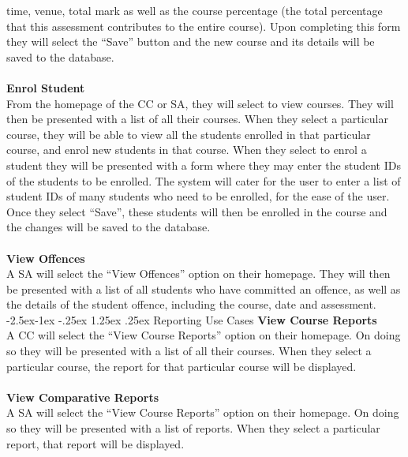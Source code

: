 \documentclass[paper=a4, fontsize=11pt]{scrartcl}
\makeatletter
\numberwithin{equation}{section}		%
\numberwithin{figure}{section}			%
\numberwithin{table}{section}				%
\renewcommand\paragraph{\@startsection{paragraph}{4}{\z@}%
            {-2.5ex\@plus -1ex \@minus -.25ex}%
            {1.25ex \@plus .25ex}%
            {\normalfont\normalsize\bfseries}}
\makeatother
\begin{document}
time, venue, total mark as well as the course percentage (the total percentage that this assessment contributes to the entire course). Upon completing this form they will select the “Save” button and the new course and its details will be saved to the database.\\\\ \textbf{Enrol Student}\\From the homepage of the CC or SA, they will select to view courses. They will then be presented with a list of all their courses. When they select a particular course, they will be able to view all the students enrolled in that particular course, and enrol new students in that course. When they select to enrol a student they will be presented with a form where they may enter the student IDs of the students to be enrolled. The system will cater for the user to enter a list of student IDs of many students who need to be enrolled, for the ease of the user. Once they select “Save”, these students will then be enrolled in the course and the changes will be saved to the database.\\\\ \textbf{View Offences}\\A SA will select the “View Offences” option on their homepage. They will then be presented with a list of all students who have committed an offence, as well as the details of the student offence, including the course, date and assessment.\\

\paragraph{Reporting Use Cases}
\textbf{View Course Reports}\\A CC  will select the “View Course Reports” option on their homepage. On doing so they will be presented with a list of all their courses. When they select a particular course, the report for that particular course will be displayed. \\\\ \textbf{View Comparative Reports}\\A SA will select the “View Course Reports” option on their homepage. On doing so they will be presented with a list of reports. When they select a particular report, that report will be displayed.
\end{document}
